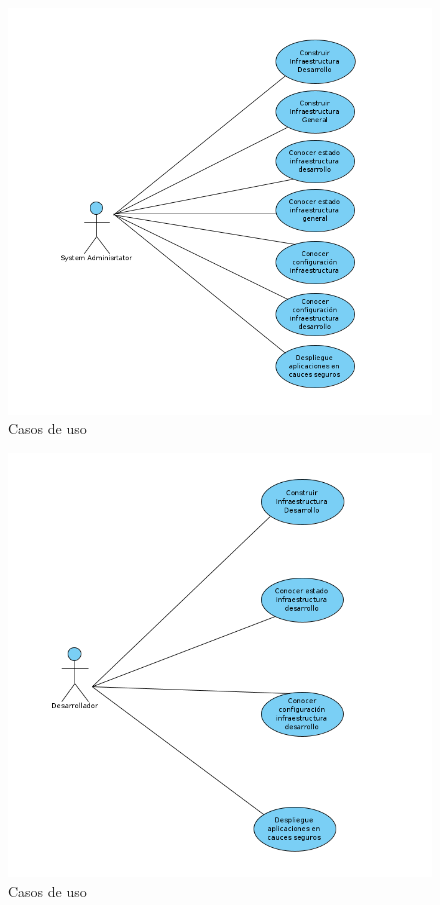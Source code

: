		\begin{figure}[!hbt]
			\centering
			\includegraphics[scale=0.4]{imagenes/Analisis/casos_uso_administrador.png}
			\caption[Casos de uso Administrador]{Casos de uso \cite{casosuso:online}} 
			\label{Casos de uso Administrador}
		\end{figure}
	
		\begin{figure}[!hbt]
			\centering
			\includegraphics[scale=0.4]{imagenes/Analisis/casos_uso_desarrollador.png}
			\caption[Casos de uso Desarrollador]{Casos de uso \cite{casosuso:online}} 
			\label{Casos de uso Desarrollador}
		\end{figure}
	
